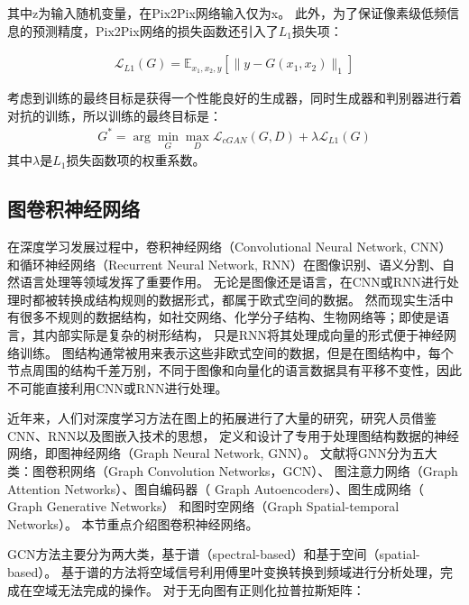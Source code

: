 \noindent 其中z为输入随机变量，在Pix2Pix网络输入仅为x。
此外，为了保证像素级低频信息的预测精度，Pix2Pix网络的损失函数还引入了$L_1$损失项：

\begin{equation}
\begin{aligned}
\mathcal{L}_{L 1}(G)=\mathbb{E}_{x_1, x_2, y}\left[\|y-G(x_1, x_2)\|_{1}\right]
\end{aligned}
\end{equation}

考虑到训练的最终目标是获得一个性能良好的生成器，同时生成器和判别器进行着对抗的训练，所以训练的最终目标是：
\begin{equation}
\begin{aligned}
G^{*}=\arg \min _{G} \max _{D} \mathcal{L}_{c G A N}(G, D)+\lambda \mathcal{L}_{L 1}(G)
\end{aligned}
\end{equation}
\noindent 其中$\lambda$是$L_1$损失函数项的权重系数。


\subsection{图卷积神经网络}

在深度学习发展过程中，卷积神经网络（Convolutional Neural Network, CNN）和循环神经网络（Recurrent Neural Network, RNN）在图像识别、语义分割、自然语言处理等领域发挥了重要作用。
无论是图像还是语言，在CNN或RNN进行处理时都被转换成结构规则的数据形式，都属于欧式空间的数据。
然而现实生活中有很多不规则的数据结构，如社交网络、化学分子结构、生物网络等；即使是语言，其内部实际是复杂的树形结构，
只是RNN将其处理成向量的形式便于神经网络训练。
图结构通常被用来表示这些非欧式空间的数据，但是在图结构中，每个节点周围的结构千差万别，不同于图像和向量化的语言数据具有平移不变性，因此不可能直接利用CNN或RNN进行处理。

近年来，人们对深度学习方法在图上的拓展进行了大量的研究，研究人员借鉴CNN、RNN以及图嵌入技术的思想，
定义和设计了专用于处理图结构数据的神经网络，即图神经网络（Graph  Neural  Network, GNN）。
文献\cite{2019A}将GNN分为五大类：图卷积网络（Graph Convolution Networks，GCN）、 图注意力网络（Graph Attention Networks）、图自编码器（ Graph Autoencoders）、图生成网络（ Graph Generative Networks） 和图时空网络（Graph Spatial-temporal Networks）。
本节重点介绍图卷积神经网络。

GCN方法主要分为两大类，基于谱（spectral-based）和基于空间（spatial-based）。
基于谱的方法将空域信号利用傅里叶变换转换到频域进行分析处理，完成在空域无法完成的操作。
对于无向图有正则化拉普拉斯矩阵：

